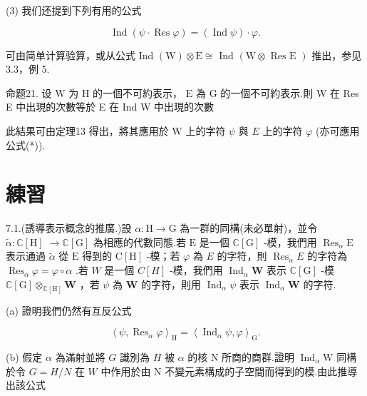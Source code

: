 \documentclass[10pt]{article}
\begin{document}
(3) 我们还提到下列有用的公式

\[
\operatorname{Ind}\left( {\psi  \cdot  \operatorname{Res}\varphi }\right)  = \left( {\operatorname{Ind}\psi }\right)  \cdot  \varphi .
\]

可由简单计算验算，或从公式 Ind \(\left( \mathrm{W}\right)  \otimes  \mathrm{E} \cong\) Ind \(\left( {\mathrm{W} \otimes  \text{ Res E }}\right)\) 推出，参见 3.3，例 5.

命题21. 设 \(\mathrm{W}\) 为 \(\mathrm{H}\) 的一個不可約表示， \(\mathrm{E}\) 為 \(\mathrm{G}\) 的一個不可約表示.則 \(\mathrm{W}\) 在 Res E 中出現的次數等於 E 在 Ind W 中出現的次數

此結果可由定理13 得出，將其應用於 \(\mathrm{W}\) 上的字符 \(\psi\) 與 \(E\) 上的字符 \(\varphi\) (亦可應用公式(*)).

\section*{練習}

7.1.(誘導表示概念的推廣.)設 \(\alpha  : \mathrm{H} \rightarrow  \mathrm{G}\) 為一群的同構(未必單射)，並令 \(\widetilde{\alpha } : \mathbb{C}\left\lbrack  \mathrm{H}\right\rbrack \; \rightarrow  \mathbb{C}\left\lbrack  \mathrm{G}\right\rbrack\) 為相應的代數同態.若 \(\mathrm{E}\) 是一個 \(\mathbb{C}\left\lbrack  \mathrm{G}\right\rbrack\) -模，我們用 \({\operatorname{Res}}_{\alpha }\mathrm{E}\) 表示通過 \(\widetilde{\alpha }\) 從 \(\mathrm{E}\) 得到的 \(\mathrm{C}\left\lbrack  \mathrm{H}\right\rbrack\) -模；若 \(\varphi\) 為 \(E\) 的字符，則 \({\operatorname{Res}}_{\alpha }E\) 的字符為 \({\operatorname{Res}}_{\alpha }\varphi  = \varphi  \circ  \alpha\) .若 \(W\) 是一個 \(C\left\lbrack  H\right\rbrack\) -模，我們用 \({\operatorname{Ind}}_{\alpha }\mathbf{W}\) 表示 \(\mathbb{C}\left\lbrack  \mathrm{G}\right\rbrack\) -模 \(\mathbb{C}\left\lbrack  \mathrm{G}\right\rbrack  { \otimes  }_{\mathbb{C}\left\lbrack  \mathrm{H}\right\rbrack  }\mathbf{W}\) ，若 \(\psi\) 為 \(\mathbf{W}\) 的字符，則用 \({\operatorname{Ind}}_{\alpha }\psi\) 表示 \({\operatorname{Ind}}_{\alpha }\mathbf{W}\) 的字符.

(a) 證明我們仍然有互反公式

\[
{\left\langle  \psi ,{\operatorname{Res}}_{\alpha }\varphi \right\rangle  }_{\mathrm{H}} = {\left\langle  {\operatorname{Ind}}_{\alpha }\psi ,\varphi \right\rangle  }_{\mathrm{G}}.
\]

(b) 假定 \(\alpha\) 為滿射並將 \(G\) 識別為 \(H\) 被 \(\alpha\) 的核 \(\mathrm{N}\) 所商的商群.證明 \({\operatorname{Ind}}_{\alpha }\mathrm{W}\) 同構於令 \(G = H/N\) 在 \(W\) 中作用於由 \(\mathrm{N}\) 不變元素構成的子空間而得到的模.由此推導出該公式
\end{document}
